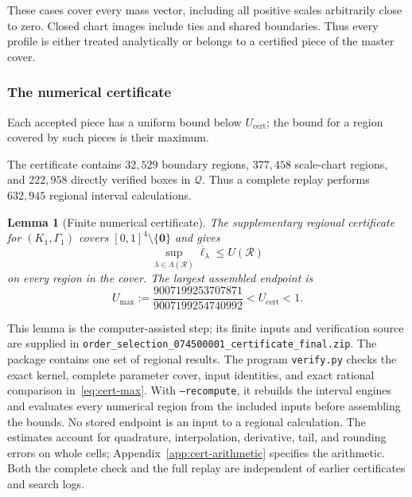\documentclass[11pt]{article}
\newtheorem{lemma}[theorem]{Lemma}
\theoremstyle{definition}
\theoremstyle{remark}
\begin{document}
These cases cover every mass vector, including all positive scales
arbitrarily close to zero.  Closed chart images include ties and shared
boundaries.  Thus every profile is either treated analytically or belongs
to a certified piece of the master cover.

\subsubsection{The numerical certificate}

Each accepted piece has a uniform bound below $U_{\mathrm{cert}}$;
the bound for a region covered by such pieces is their maximum.

The certificate contains $32{,}529$ boundary regions, $377{,}458$
scale-chart regions, and $222{,}958$ directly verified boxes in $\mathcal Q$.
Thus a complete replay performs $632{,}945$ regional interval calculations.

\begin{lemma}[Finite numerical certificate]\label{lem:cert-finite-data}
The supplementary regional certificate for $(K_1,\Gamma_1)$ covers
$[0,1]^4\setminus\{\mathbf0\}$ and gives
\begin{equation}\label{eq:cert-regional-upper}
 \sup_{\lambda\in\Lambda(\mathcal R)}\overline\ell_\lambda
 \le U(\mathcal R)
\end{equation}
on every region in the cover.  The largest assembled endpoint is
\begin{equation}\label{eq:cert-max}
 U_{\max}:=\frac{9007199253707871}{9007199254740992}<U_{\mathrm{cert}}<1.
\end{equation}
\end{lemma}

This lemma is the computer-assisted step; its finite inputs and
verification source are supplied in
\nolinkurl{order_selection_074500001_certificate_final.zip}.
The package contains one set of regional results.  The program
\texttt{verify.py} checks the exact kernel, complete parameter cover,
input identities, and exact rational comparison in~\eqref{eq:cert-max}.
With \texttt{--recompute}, it rebuilds the interval engines and evaluates
every numerical region from the included inputs before assembling the
bounds.  No stored endpoint is an input to a regional calculation.
The estimates account for quadrature, interpolation, derivative, tail,
and rounding errors on whole cells; Appendix~\ref{app:cert-arithmetic}
specifies the arithmetic.  Both the complete check and the full replay
are independent of earlier certificates and search logs.
\end{document}
